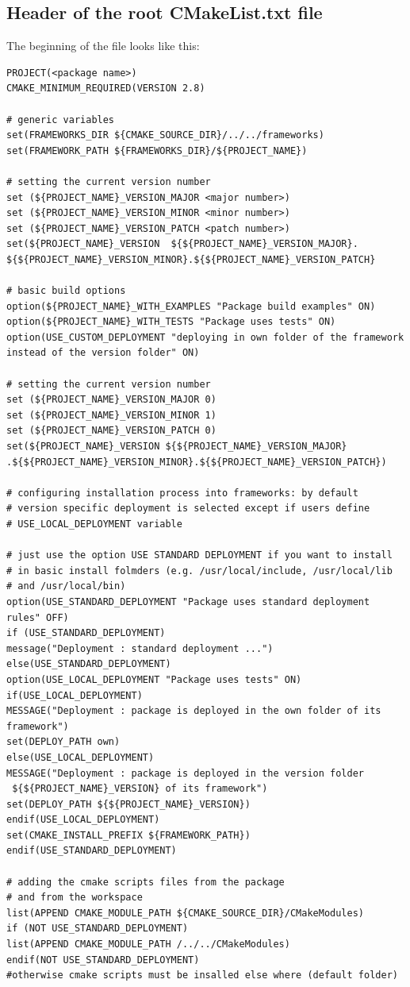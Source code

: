 \documentclass[12pt,a4paper]{article}
\begin{document}
\subsection{Header of the root CMakeList.txt file}

The beginning of the file looks like this:

\begin{verbatim}
PROJECT(<package name>)
CMAKE_MINIMUM_REQUIRED(VERSION 2.8)

# generic variables
set(FRAMEWORKS_DIR ${CMAKE_SOURCE_DIR}/../../frameworks)
set(FRAMEWORK_PATH ${FRAMEWORKS_DIR}/${PROJECT_NAME})

# setting the current version number
set (${PROJECT_NAME}_VERSION_MAJOR <major number>)
set (${PROJECT_NAME}_VERSION_MINOR <minor number>)
set (${PROJECT_NAME}_VERSION_PATCH <patch number>)
set(${PROJECT_NAME}_VERSION  ${${PROJECT_NAME}_VERSION_MAJOR}.
${${PROJECT_NAME}_VERSION_MINOR}.${${PROJECT_NAME}_VERSION_PATCH}

# basic build options
option(${PROJECT_NAME}_WITH_EXAMPLES "Package build examples" ON)
option(${PROJECT_NAME}_WITH_TESTS "Package uses tests" ON)
option(USE_CUSTOM_DEPLOYMENT "deploying in own folder of the framework
instead of the version folder" ON)

# setting the current version number
set (${PROJECT_NAME}_VERSION_MAJOR 0)
set (${PROJECT_NAME}_VERSION_MINOR 1)
set (${PROJECT_NAME}_VERSION_PATCH 0)
set(${PROJECT_NAME}_VERSION ${${PROJECT_NAME}_VERSION_MAJOR}
.${${PROJECT_NAME}_VERSION_MINOR}.${${PROJECT_NAME}_VERSION_PATCH})

# configuring installation process into frameworks: by default
# version specific deployment is selected except if users define
# USE_LOCAL_DEPLOYMENT variable

# just use the option USE STANDARD DEPLOYMENT if you want to install 
# in basic install folmders (e.g. /usr/local/include, /usr/local/lib 
# and /usr/local/bin) 
option(USE_STANDARD_DEPLOYMENT "Package uses standard deployment rules" OFF)
if (USE_STANDARD_DEPLOYMENT)
message("Deployment : standard deployment ...")
else(USE_STANDARD_DEPLOYMENT)
option(USE_LOCAL_DEPLOYMENT "Package uses tests" ON)
if(USE_LOCAL_DEPLOYMENT)
MESSAGE("Deployment : package is deployed in the own folder of its framework")
set(DEPLOY_PATH own)
else(USE_LOCAL_DEPLOYMENT)
MESSAGE("Deployment : package is deployed in the version folder 
 ${${PROJECT_NAME}_VERSION} of its framework")
set(DEPLOY_PATH ${${PROJECT_NAME}_VERSION})
endif(USE_LOCAL_DEPLOYMENT)
set(CMAKE_INSTALL_PREFIX ${FRAMEWORK_PATH})
endif(USE_STANDARD_DEPLOYMENT)

# adding the cmake scripts files from the package 
# and from the workspace
list(APPEND CMAKE_MODULE_PATH ${CMAKE_SOURCE_DIR}/CMakeModules)
if (NOT USE_STANDARD_DEPLOYMENT)
list(APPEND CMAKE_MODULE_PATH /../../CMakeModules)
endif(NOT USE_STANDARD_DEPLOYMENT)
#otherwise cmake scripts must be insalled else where (default folder)

\end{verbatim}
\end{document}
